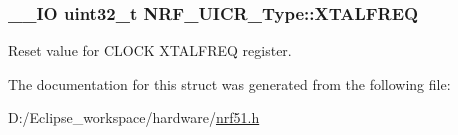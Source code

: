 \subsubsection[{X\+T\+A\+L\+F\+R\+E\+Q}]{\setlength{\rightskip}{0pt plus 5cm}\+\_\+\+\_\+\+I\+O uint32\+\_\+t N\+R\+F\+\_\+\+U\+I\+C\+R\+\_\+\+Type\+::\+X\+T\+A\+L\+F\+R\+E\+Q}\label{struct_n_r_f___u_i_c_r___type_a30dee3ac4cd33585413eaddb062a43a6}
Reset value for C\+L\+O\+C\+K X\+T\+A\+L\+F\+R\+E\+Q register. 

The documentation for this struct was generated from the following file\+:\begin{DoxyCompactItemize}
\item 
D\+:/\+Eclipse\+\_\+workspace/hardware/\hyperlink{nrf51_8h}{nrf51.\+h}\end{DoxyCompactItemize}
